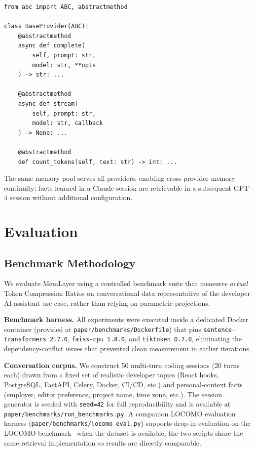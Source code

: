 \documentclass[10pt,twocolumn]{article}
\begin{document}
\begin{lstlisting}[caption={Provider adapter abstract base class.},label=lst:provider]
from abc import ABC, abstractmethod

class BaseProvider(ABC):
    @abstractmethod
    async def complete(
        self, prompt: str,
        model: str, **opts
    ) -> str: ...

    @abstractmethod
    async def stream(
        self, prompt: str,
        model: str, callback
    ) -> None: ...

    @abstractmethod
    def count_tokens(self, text: str) -> int: ...
\end{lstlisting}

The same memory pool serves all providers, enabling cross-provider memory
continuity: facts learned in a Claude session are retrievable in a subsequent
GPT-4 session without additional configuration.

\section{Evaluation}
\label{sec:evaluation}

\subsection{Benchmark Methodology}
\label{sec:methodology}

\noindent
We evaluate MemLayer using a controlled benchmark suite that measures
\emph{actual} Token Compression Ratios on conversational data representative
of the developer AI-assistant use case, rather than relying on parametric
projections.

\textbf{Benchmark harness.}
All experiments were executed inside a dedicated Docker container (provided
at \texttt{paper/benchmarks/Dockerfile}) that pins
\texttt{sentence-transformers~2.7.0}, \texttt{faiss-cpu~1.8.0}, and
\texttt{tiktoken~0.7.0}, eliminating the dependency-conflict issues that
prevented clean measurement in earlier iterations.

\textbf{Conversation corpus.}
We construct 50 multi-turn coding sessions (20 turns each) drawn from a
fixed set of realistic developer topics (React hooks, PostgreSQL, FastAPI,
Celery, Docker, CI/CD, etc.) and personal-context facts (employer, editor
preference, project name, time zone, etc.). The session generator is seeded
with \texttt{seed=42} for full reproducibility and is available at
\texttt{paper/benchmarks/run\_benchmarks.py}.
A companion LOCOMO evaluation harness (\texttt{paper/benchmarks/locomo\_eval.py})
supports drop-in evaluation on the LOCOMO benchmark~\citep{maharana2024locomo}
when the dataset is available; the two scripts share the same retrieval
implementation so results are directly comparable.
\end{document}
